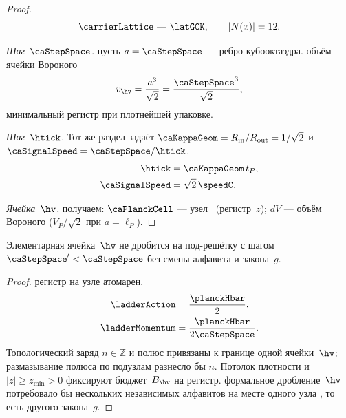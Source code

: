 \begin{proof}
\[
  \carrierLattice\ \text{--- \latGCK},\qquad |N(x)|=12.
\]

\smallskip
\emph{Шаг~$\caStepSpace$.}
пусть $a=\caStepSpace$ --- ребро кубооктаэдра.
\pfollows
объём ячейки Вороного
\[
  v_{\hv}=\frac{a^3}{\sqrt{2}}=\frac{\caStepSpace^3}{\sqrt{2}},
\]
минимальный регистр при плотнейшей упаковке.

\smallskip
\emph{Шаг~$\htick$.}
Тот же раздел задаёт $\caKappaGeom=R_{\mathrm{in}}/R_{\mathrm{out}}=1/\sqrt{2}$ и
$\caSignalSpeed=\caStepSpace/\htick$.
\begin{align}
  \htick &= \caKappaGeom\,t_P, \\
  \caSignalSpeed &= \sqrt{2}\,\speedC.
\end{align}

\smallskip
\emph{Ячейка~$\hv$.}
получаем: $\PlanckCell$ --- узел \latGCKshort\ (регистр~$z$); $dV$ --- объём Вороного ($V_P/\sqrt{2}$ при $a=\ell_P$).
\end{proof}

\begin{lemma}
\label{lem:register-atom}
Элементарная ячейка~$\hv$ не дробится
на под-решётку с шагом $\caStepSpace'<\caStepSpace$ без смены алфавита и закона~$g$.
\end{lemma}

\begin{proof}
регистр на узле атомарен.
\begin{align}
  \ladderAction &= \frac{\planckHbar}{2}, \\
  \ladderMomentum &= \frac{\planckHbar}{2\caStepSpace}.
\end{align}
Топологический заряд $n\in\mathbb{Z}$ и полюс привязаны к границе одной ячейки~$\hv$;
размазывание полюса по подузлам разнесло бы $n$.
Потолок плотности и $|z|\ge z_{\min}>0$ фиксируют бюджет~$B_{\hv}$ на регистр.
\phence формальное дробление~$\hv$ потребовало бы нескольких независимых алфавитов на месте одного узла \latGCKshort, то есть другого закона~$g$.
\end{proof}


